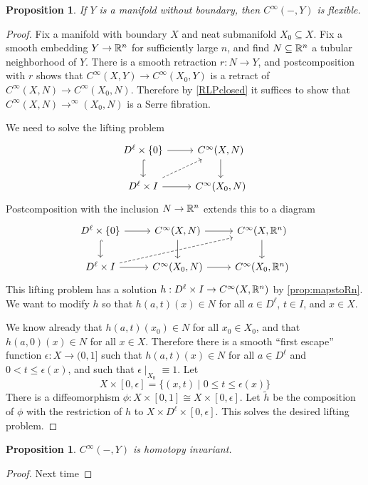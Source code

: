 \documentclass{article}
\newtheorem{proposition}[theorem]{Proposition}
\newtheorem{proposed work}[theorem]{Proposed Work}
\begin{document}
\begin{proposition} \label{prop:mapstonoboundary}
  If $Y$ is a manifold without boundary, then $C^\infty(-, Y)$ is
  flexible. 
\end{proposition}

\begin{proof}
  Fix a manifold with boundary $X$ and neat submanifold
  $X_0\subseteq X$. Fix a smooth embedding $Y\to \mathbb R^n$ for
  sufficiently large $n$, and find $N\subseteq \mathbb R^n$ a tubular
  neighborhood of $Y$. There is a smooth retraction $r: N \to Y$, and
  postcomposition with $r$ shows that
  $C^\infty(X,Y)\to C^\infty(X_0, Y)$ is a retract of
  $C^\infty(X, N) \to C^\infty(X_0, N)$. Therefore by \ref{RLPclosed}
  it suffices to show that $C^\infty(X, N) \to ^\infty(X_0, N)$ is a
  Serre fibration.

  We need to solve the lifting problem
  \begin{equation*}
    \begin{tikzcd}
      D^\ell \times \{0\} \arrow[r] \arrow[hookrightarrow]{d}
      & C^\infty(X,N) \arrow[d] 
      \\
      D^\ell \times I \arrow[r] \arrow[dashed,ur] 
      & C^\infty(X_0, N) 
    \end{tikzcd}
  \end{equation*}
  Postcomposition with the inclusion $N\to \mathbb R^n$ extends this to a
  diagram
  \begin{equation*}
    \begin{tikzcd}
      D^\ell \times \{0\} \arrow[r] \arrow[hookrightarrow]{d}
      & C^\infty(X,N) \arrow[d] \arrow[r]
      & C^\infty(X, \R^n) \arrow[d] 
      \\
      D^\ell \times I \arrow[r] \arrow[dashed, urr]
      & C^\infty(X_0, N) \arrow[r]
      & C^\infty(X_0, \R^n)
    \end{tikzcd}
  \end{equation*}
  This lifting problem has a solution
  $h: D^\ell\times I \to C^\infty(X,\mathbb R^n)$ by \ref{prop:mapstoRn}. We
  want to modify $h$ so that $h(a,t)(x)\in N$ for all $a\in D^\ell$,
  $t\in I$, and $x\in X$.

  We know already that $h(a,t)(x_0) \in N$ for all $x_0\in X_0$, and
  that $h(a,0)(x)\in N$ for all $x\in X$. Therefore there is a
  smooth %
  ``first escape'' function $\epsilon :X\to (0,1]$ such
  that $h(a,t)(x)\in N$ for all $a\in D^\ell$ and
  $0 < t \leq \epsilon(x)$, and such that
  $\epsilon \mid_{X_0} \equiv 1$. Let 
  \[
    X\times [0,\epsilon] = \{ (x,t) \mid 0\leq t \leq \epsilon(x) \}
  \]
  There is a diffeomorphism
  $\phi: X\times [0,1] \cong X\times [0,\epsilon]$. Let $\tilde h$ be
  the composition of $\phi$ with the restriction of $h$ to $X\times
  D^\ell \times [0,\epsilon]$. This solves the desired lifting problem.
\end{proof}

\begin{proposition} \label{prop:mapstoyinvariant}
  $C^\infty(-,Y)$ is homotopy invariant. %
\end{proposition}
\begin{proof}
  Next time
\end{proof}


\printbibliography
\end{document}
